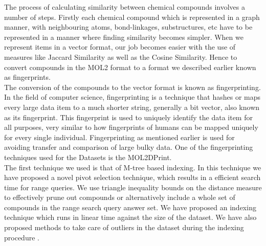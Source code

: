 The process of calculating similarity between chemical compounds involves a number of steps. Firstly each chemical compound which is represented in a graph manner, with neighbouring atoms, bond-linkages, substructures, etc have to be represented in a manner where finding similarity becomes simpler. When we represent items in a vector format, our job becomes easier with the use of measures like Jaccard Similarity as well as the Cosine Similarity. Hence to convert compounds in the MOL2 format to a format we described earlier known as fingerprints. \\
%

The conversion of the compounds to the vector format is known as fingerprinting.  In the field of computer science, fingerprinting is a technique that hashes or maps every large data item to a much shorter string, generally a bit vector, also known as its fingerprint. This fingerprint is used to uniquely identify the data item for all purposes, very similar to how fingerprints of humans can be mapped uniquely for every single individual. Fingerprinting as mentioned earlier is used for avoiding transfer and comparison of large bulky data. One of the fingerprinting techniques used for the Datasets is the MOL2DPrint.\\

The first technique we used is that of M-tree \cite{ciaccia1997indexing} based indexing. In this technique we have proposed a novel pivot selection technique, which results in a efficient search time for range queries. We use triangle inequality bounds on the distance measure to effectively prune out compounds or alternatively include a whole set of compounds in the range search query answer set. We have proposed an indexing technique which runs in linear time against the size of the dataset. We have also proposed methods to take care of outliers in the dataset during the indexing procedure .\\


